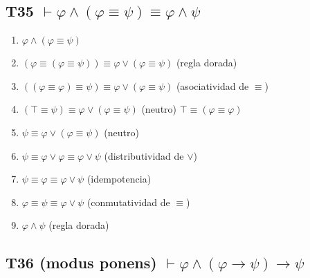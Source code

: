\documentclass[a4paper,11pt]{article}
\begin{document}
\subsection{T35 $\vdash \varphi \land (\varphi \equiv \psi) \equiv \varphi \land \psi$}

\begin{enumerate}
    \item $\varphi \land (\varphi \equiv \psi)$
    \item $(\varphi \equiv (\varphi \equiv \psi)) \equiv \varphi \lor (\varphi \equiv \psi)$ \hfill (regla dorada)
    \item $((\varphi \equiv \varphi) \equiv \psi) \equiv \varphi \lor (\varphi \equiv \psi)$ \hfill (asociatividad de $\equiv$)
    \item $(\top \equiv \psi) \equiv \varphi \lor (\varphi \equiv \psi)$ \hfill (neutro) $\top \equiv (\varphi \equiv \varphi)$
    \item $\psi \equiv \varphi \lor (\varphi \equiv \psi)$ \hfill (neutro)
    \item $\psi \equiv \varphi \lor \varphi \equiv \varphi \lor \psi$ \hfill (distributividad de $\lor$)
    \item $\psi \equiv \varphi \equiv \varphi \lor \psi$ \hfill (idempotencia)
    \item $\varphi \equiv \psi \equiv \varphi \lor \psi$ \hfill (conmutatividad de $\equiv$)
    \item $\varphi \land \psi$ \hfill (regla dorada)
\end{enumerate}

\subsection{T36 (modus ponens) $\vdash \varphi \land (\varphi \rightarrow \psi) \rightarrow \psi$}
\end{document}
